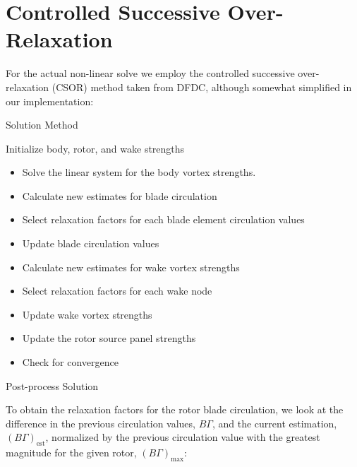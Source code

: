 \section{Controlled Successive Over-Relaxation}

For the actual non-linear solve we employ the controlled successive over-relaxation (CSOR) method taken from DFDC, although somewhat simplified in our implementation:

\begin{algorithm}
\caption{Solution Method}\label{alg:csor}
\begin{algorithmic}
\State Initialize body, rotor, and wake strengths
\begin{itemize}
    \renewcommand\labelitemi{\(\cdot\)}
    \setlength{\itemindent}{1em}
    \item Solve the linear system for the body vortex strengths.
    \item Calculate new estimates for blade circulation 
    \item Select relaxation factors for each blade element circulation values 
    \item Update blade circulation values 
    \item Calculate new estimates for wake vortex strengths 
    \item Select relaxation factors for each wake node 
    \item Update wake vortex strengths 
    \item Update the rotor source panel strengths 
    \item Check for convergence 
\end{itemize}
\EndWhile
\State Post-process Solution
\end{algorithmic}
\end{algorithm}

To obtain the relaxation factors for the rotor blade circulation, we look at the difference in the previous circulation values,
\(B\Gamma\), and the current estimation,
\((B\Gamma)_\text{est}\), normalized by the previous circulation value with the greatest magnitude for the given rotor, \((B\Gamma)_\text{max}\):

